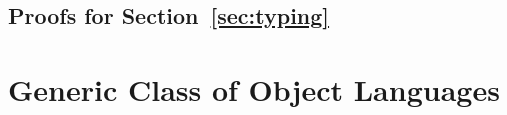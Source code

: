 \documentclass[sigplan,10pt, anonymous]{acmart}
\newenvironment{LibCode*}{%
  \begin{tcolorbox}[%
    colframe=white,%
    boxrule=0.0pt,%
    top=2.5pt,%
    left=2.5pt,%
    bottom=2.5pt,%
    right=2.5pt,%
    boxsep=0pt%
  ]\vspace{-0.2\baselineskip}%
}{%
  \vspace{-1\baselineskip}%
  \end{tcolorbox}%
}
\newcommand*\LibCode[1]{\begin{LibCode*}{#1}\end{LibCode*}}
\newcommand*\AppCode[1]{{#1}}
\begin{document}
  \LibCode\KDistLiftCompose
  \LibCode\KDistLiftComposeProof

  \LibCode\KCommLiftWeaken
  \LibCode\KCommLiftWeakenProof

  \LibCode\KCommLiftWeakenTraverse
  \LibCode\KCommLiftWeakenTraverseProof

  \LibCode\KWeakenCancelsSingle
  \LibCode\KWeakenCancelsSingleProof

  \LibCode\KWeakenCancelsSingleTraverse
  \LibCode\KWeakenCancelsSingleTraverseProof

  \LibCode\KDistLiftSingle
  \LibCode\KDistLiftSingleProof

  \LibCode\KDistLiftSingleTraverse
  \LibCode\KDistLiftSingleTraverseProof




  \subsection{Proofs for Section~\ref{sec:typing}}
  \LibCode\KLiftTyping
  \LibCode\KLiftTypingProof

  \LibCode\KSingleTyping
  \LibCode\KSingleTypingProof




  \section{Generic Class of Object Languages}
  \label{sec:generic-class}
\end{document}
